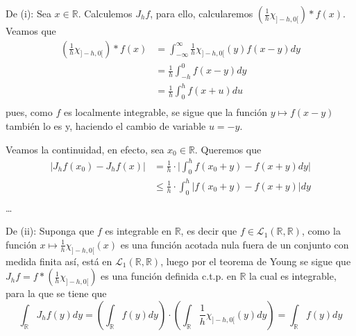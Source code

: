 \documentclass[12pt]{report}
\theoremstyle{largebreak}
\newcommand\abs[1]{\ensuremath{\big|#1\big|}}
\begin{document}
    \begin{sol}
        De (i): Sea $x\in\mathbb{R}$. Calculemos $J_hf$, para ello, calcularemos $\left(\frac{1}{h}\chi_{ ]-h,0[} \right)*f(x)$. Veamos que
        \begin{equation*}
            \begin{split}
                \left(\frac{1}{h}\chi_{ ]-h,0[} \right)*f(x)&=\int_{-\infty}^\infty\frac{1}{h}\chi_{ ]-h,0[}(y) f(x-y)dy\\
                &=\frac{1}{h}\int_{-h}^0f(x-y)dy\\
                &=\frac{1}{h}\int_{0}^hf(x+u)du\\
            \end{split}
        \end{equation*}
        pues, como $f$ es localmente integrable, se sigue que la función $y\mapsto f(x-y)$ también lo es y, haciendo el cambio de variable $u=-y$. 
        
        Veamos la continuidad, en efecto, sea $x_0\in\mathbb{R}$. Queremos que
        \begin{equation*}
            \begin{split}
                \abs{J_hf(x_0)-J_hf(x)}&=\frac{1}{h}\cdot\abs{\int_0^hf(x_0+y)-f(x+y)dy}\\
                &\leq\frac{1}{h}\cdot\int_0^h\abs{f(x_0+y)-f(x+y)}dy\\
            \end{split}
        \end{equation*}
        \dots

        De (ii): Suponga que $f$ es integrable en $\mathbb{R}$, es decir que $f\in\mathcal{L}_1(\mathbb{R},\mathbb{R})$, como la función $x\mapsto \frac{1}{h}\chi_{]-h,0[}(x)$ es una función acotada nula fuera de un conjunto con medida finita así, está en $\mathcal{L}_1(\mathbb{R},\mathbb{R})$, luego por el teorema de Young se sigue que $J_hf=f*\left(\frac{1}{h}\chi_{]-h,0[}\right)$ es una función definida c.t.p. en $\mathbb{R}$ la cual es integrable, para la que se tiene que
        \begin{equation*}
            \int_\mathbb{R} J_hf(y)dy=\left(\int_\mathbb{R}f(y)dy \right)\cdot\left(\int_\mathbb{R}\frac{1}{h}\chi_{]-h,0[}(y)dy \right)=\int_\mathbb{R}f(y)dy
        \end{equation*}


\end{sol}
\end{document}
